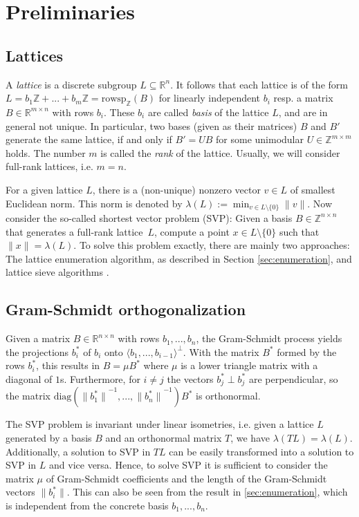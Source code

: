 \documentclass{scrartcl}
\newcommand{\Z}{\mathbb{Z}}
\newcommand{\R}{\mathbb{R}}
\begin{document}
    \section{Preliminaries}

    \subsection{Lattices}

    A \emph{lattice} is a discrete subgroup $L \subseteq \R^n$. 
    It follows that each lattice is of the form $L = b_1 \Z + ... + b_m \Z = \mathrm{rowsp}_{\Z}(B)$ for linearly independent $b_i$ resp. a matrix $B \in \R^{m \times n}$ with rows $b_i$. 
    These $b_i$ are called \emph{basis} of the lattice $L$, and are in general not unique. 
    In particular, two bases (given as their matrices) $B$ and $B'$ generate the same lattice, if and only if $B' = UB$ for some unimodular $U \in \Z^{m \times m}$ holds.
    The number $m$ is called the \emph{rank} of the lattice. Usually, we will consider full-rank lattices, i.e. $m = n$.

    For a given lattice $L$, there is a (non-unique) nonzero vector $v \in L$ of smallest Euclidean norm. This norm is denoted by $\lambda(L) := \min_{v \in L \setminus \{0\}} \| v \|$. 
    Now consider the so-called shortest vector problem (SVP): Given a basis $B \in \Z^{n \times n}$ that generates a full-rank lattice~$L$, compute a point $x \in L \setminus \{0\}$ such that $\| x \| = \lambda(L)$. 
    To solve this problem exactly, there are mainly two approaches: The lattice enumeration algorithm, as described in Section \ref{sec:enumeration}, and lattice sieve algorithms \cite{sieve, g6k}.

    \subsection{Gram-Schmidt orthogonalization}

    Given a matrix $B \in \R^{n \times n}$ with rows $b_1, ..., b_n$, the Gram-Schmidt process yields the projections $b^*_i$ of $b_i$ onto $\langle b_1, ..., b_{i - 1} \rangle ^ \perp$. With the matrix $B^*$ formed by the rows $b^*_i$, this results in $B = \mu B^*$ where $\mu$ is a lower triangle matrix with a diagonal of $1$s. Furthermore, for $i \neq j$ the vectors $b^*_j \perp b^*_j$ are perpendicular, so the matrix $\mathrm{diag}( {\|b^*_1\|}^{-1}, ..., {\|b^*_n\|}^{-1} ) B^*$ is orthonormal.

    The SVP problem is invariant under linear isometries, i.e. given a lattice $L$ generated by a basis $B$ and an orthonormal matrix $T$, we have $\lambda(TL) = \lambda(L)$. Additionally, a solution to SVP in $TL$ can be easily transformed into a solution to SVP in $L$ and vice versa.
    Hence, to solve SVP it is sufficient to consider the matrix $\mu$ of Gram-Schmidt coefficients and the length of the Gram-Schmidt vectors $\| b^*_i \|$. This can also be seen from the result in \ref{sec:enumeration}, which is independent from the concrete basis $b_1, ..., b_n$.
\end{document}
